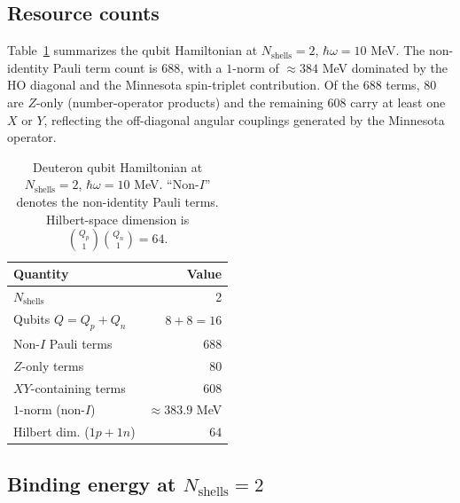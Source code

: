 \documentclass[twocolumn,prc,amsmath,amssymb,superscriptaddress]{revtex4-2}
\newcommand{\gvq}[2]{#2}
\begin{document}
\subsection{Resource counts}

Table~\ref{tab:deuteron} summarizes the qubit Hamiltonian at
$N_{\mathrm{shells}}=2$, $\hbar\omega = 10$ MeV. The non-identity Pauli
term count is $688$, with a $1$-norm of $\approx 384$ MeV dominated by
the HO diagonal and the Minnesota spin-triplet contribution. Of the
$688$ terms, $80$ are $Z$-only (number-operator products) and the
remaining $608$ carry at least one $X$ or $Y$, reflecting the
off-diagonal angular couplings generated by the Minnesota operator.

\begin{table}[t]
  \centering
  \caption{Deuteron qubit Hamiltonian at $N_{\mathrm{shells}}=2$,
    $\hbar\omega = 10$ MeV. ``Non-$I$'' denotes the non-identity Pauli
    terms. Hilbert-space dimension is
    $\binom{Q_p}{1}\binom{Q_n}{1} = 64$.}
  \label{tab:deuteron}
  \begin{ruledtabular}
  \begin{tabular}{lr}
    Quantity & Value \\
    \hline
    $N_{\mathrm{shells}}$ & 2 \\
    Qubits $Q = Q_p + Q_n$ & $8 + 8 = 16$ \\
    Non-$I$ Pauli terms & $688$ \\
    $Z$-only terms & $80$ \\
    $XY$-containing terms & $608$ \\
    $1$-norm (non-$I$) & $\approx \gvq{p23_deuteron_lambda}{383.9}$ MeV \\
    Hilbert dim. ($1p+1n$) & $64$ \\
  \end{tabular}
  \end{ruledtabular}
\end{table}

\subsection{Binding energy at $N_{\mathrm{shells}}=2$}
\end{document}

